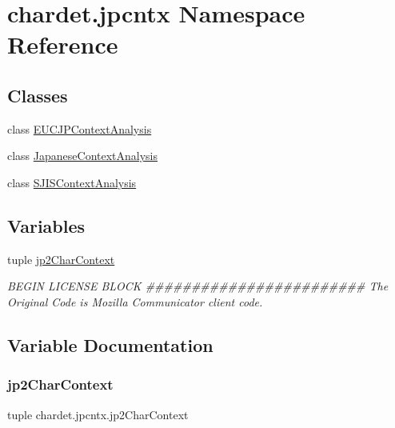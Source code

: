 \hypertarget{namespacechardet_1_1jpcntx}{}\section{chardet.\+jpcntx Namespace Reference}
\label{namespacechardet_1_1jpcntx}
\subsection*{Classes}
\begin{DoxyCompactItemize}
\item 
class \hyperlink{classchardet_1_1jpcntx_1_1_e_u_c_j_p_context_analysis}{E\+U\+C\+J\+P\+Context\+Analysis}
\item 
class \hyperlink{classchardet_1_1jpcntx_1_1_japanese_context_analysis}{Japanese\+Context\+Analysis}
\item 
class \hyperlink{classchardet_1_1jpcntx_1_1_s_j_i_s_context_analysis}{S\+J\+I\+S\+Context\+Analysis}
\end{DoxyCompactItemize}
\subsection*{Variables}
\begin{DoxyCompactItemize}
\item 
tuple \hyperlink{namespacechardet_1_1jpcntx_aa6ae7f3c77e981d2248bcdc85a239f7f}{jp2\+Char\+Context}
\begin{DoxyCompactList}\small\item\em B\+E\+G\+IN L\+I\+C\+E\+N\+SE B\+L\+O\+CK \#\#\#\#\#\#\#\#\#\#\#\#\#\#\#\#\#\#\#\#\#\#\#\# The Original Code is Mozilla Communicator client code. \end{DoxyCompactList}\end{DoxyCompactItemize}


\subsection{Variable Documentation}
\mbox{\label{namespacechardet_1_1jpcntx_aa6ae7f3c77e981d2248bcdc85a239f7f}} 
\subsubsection{\texorpdfstring{jp2\+Char\+Context}{jp2CharContext}}
{\footnotesize\ttfamily tuple chardet.\+jpcntx.\+jp2\+Char\+Context}



